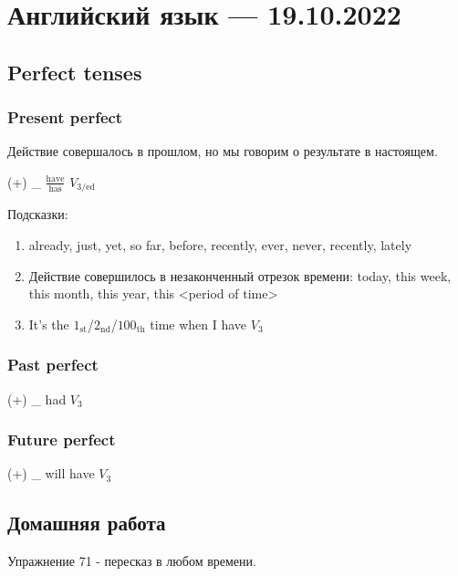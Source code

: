 \documentclass{article}
\begin{document}
\pagebreak
\section{Английский язык — 19.10.2022}

\subsection{Perfect tenses}

\subsubsection{Present perfect}

\begin{flushleft}

Действие совершалось в прошлом, но мы говорим о результате в настоящем.

\hfill

(+) \_ $\frac{\text{have}}{\text{has}}$ $V_{3/\text{ed}}$

\hfill

Подсказки:

\begin{enumerate}
    \item already, just, yet, so far, before, recently, ever, never, recently, lately
    \item Действие совершилось в незаконченный отрезок времени: today, this week, this month, this year, this <period of time>
    \item It's the $1_{\text{st}}$/$2_{\text{nd}}$/$100_{\text{th}}$ time when I have $V_3$
\end{enumerate}

\subsubsection{Past perfect}

(+) \_ had $V_3$

\subsubsection{Future perfect}

(+) \_ will have $V_3$

\subsection{Домашняя работа}

Упражнение 71 - пересказ в любом времени.

\end{flushleft}
\end{document}
